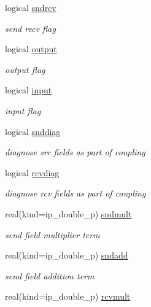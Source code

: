 \begin{DoxyCompactItemize}
logical \hyperlink{structmod__oasis__coupler_1_1prism__coupler__type_a45db2da67a23b8a4b693d0b7882996b5}{sndrcv}
\begin{DoxyCompactList}\small\item\em send recv flag \end{DoxyCompactList}\item 
logical \hyperlink{structmod__oasis__coupler_1_1prism__coupler__type_a56fc19e4619dd8224859f222566ea7ca}{output}
\begin{DoxyCompactList}\small\item\em output flag \end{DoxyCompactList}\item 
logical \hyperlink{structmod__oasis__coupler_1_1prism__coupler__type_a1cda09cced2782af8cdccae35a00107d}{input}
\begin{DoxyCompactList}\small\item\em input flag \end{DoxyCompactList}\item 
logical \hyperlink{structmod__oasis__coupler_1_1prism__coupler__type_ae0ad5bd2dfbc17cbdceeda23c92dbebe}{snddiag}
\begin{DoxyCompactList}\small\item\em diagnose src fields as part of coupling \end{DoxyCompactList}\item 
logical \hyperlink{structmod__oasis__coupler_1_1prism__coupler__type_a05d7a7317dd4b063ced94cebd4dfedc7}{rcvdiag}
\begin{DoxyCompactList}\small\item\em diagnose rcv fields as part of coupling \end{DoxyCompactList}\item 
real(kind=ip\+\_\+double\+\_\+p) \hyperlink{structmod__oasis__coupler_1_1prism__coupler__type_ad17bb1c791d2ef48cf7b4abf955bf43b}{sndmult}
\begin{DoxyCompactList}\small\item\em send field multiplier term \end{DoxyCompactList}\item 
real(kind=ip\+\_\+double\+\_\+p) \hyperlink{structmod__oasis__coupler_1_1prism__coupler__type_ad0176e1d6bdcb0f50fc5889921aec8dc}{sndadd}
\begin{DoxyCompactList}\small\item\em send field addition term \end{DoxyCompactList}\item 
real(kind=ip\+\_\+double\+\_\+p) \hyperlink{structmod__oasis__coupler_1_1prism__coupler__type_a9733b71cc0ade029f7f19be6ad114596}{rcvmult}

\end{DoxyCompactItemize}
